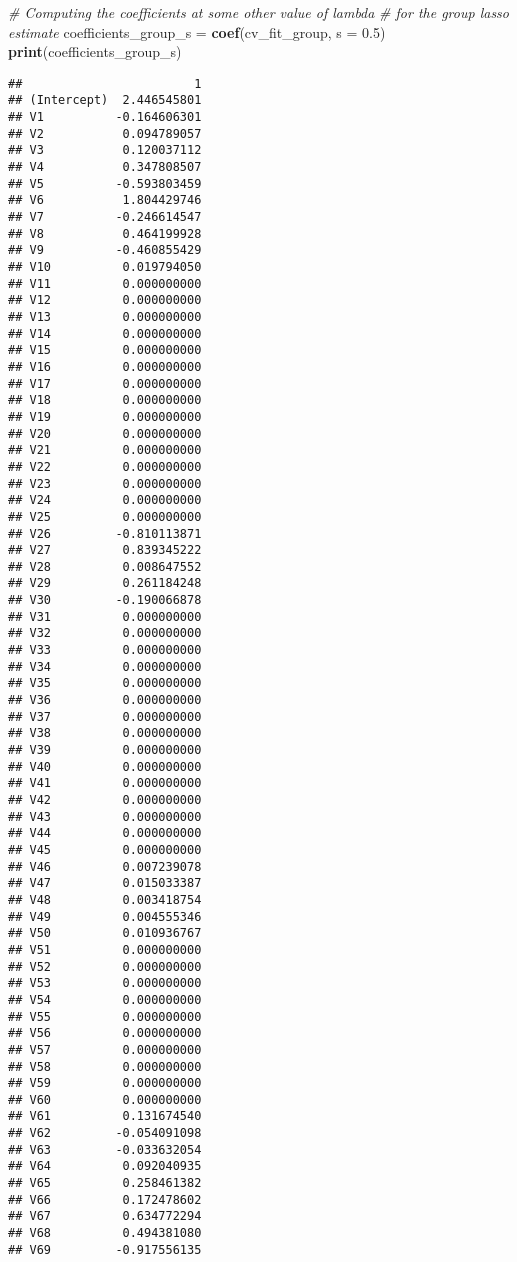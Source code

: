 \documentclass[
]{book}
\newenvironment{Shaded}{\begin{snugshade}}{\end{snugshade}}
\newcommand{\CommentTok}[1]{\textcolor[rgb]{0.56,0.35,0.01}{\textit{#1}}}
\newcommand{\DataTypeTok}[1]{\textcolor[rgb]{0.13,0.29,0.53}{#1}}
\newcommand{\FloatTok}[1]{\textcolor[rgb]{0.00,0.00,0.81}{#1}}
\newcommand{\KeywordTok}[1]{\textcolor[rgb]{0.13,0.29,0.53}{\textbf{#1}}}
\newcommand{\NormalTok}[1]{#1}
\newcommand{\StringTok}[1]{\textcolor[rgb]{0.31,0.60,0.02}{#1}}
\begin{document}
\begin{Shaded}
\begin{Highlighting}[]
\CommentTok{# Computing the coefficients at some other value of lambda}
\CommentTok{# for the group lasso estimate}
\NormalTok{coefficients_group_s =}\StringTok{ }\KeywordTok{coef}\NormalTok{(cv_fit_group, }\DataTypeTok{s =} \FloatTok{0.5}\NormalTok{)}
\KeywordTok{print}\NormalTok{(coefficients_group_s)}
\end{Highlighting}
\end{Shaded}

\begin{verbatim}
##                        1
## (Intercept)  2.446545801
## V1          -0.164606301
## V2           0.094789057
## V3           0.120037112
## V4           0.347808507
## V5          -0.593803459
## V6           1.804429746
## V7          -0.246614547
## V8           0.464199928
## V9          -0.460855429
## V10          0.019794050
## V11          0.000000000
## V12          0.000000000
## V13          0.000000000
## V14          0.000000000
## V15          0.000000000
## V16          0.000000000
## V17          0.000000000
## V18          0.000000000
## V19          0.000000000
## V20          0.000000000
## V21          0.000000000
## V22          0.000000000
## V23          0.000000000
## V24          0.000000000
## V25          0.000000000
## V26         -0.810113871
## V27          0.839345222
## V28          0.008647552
## V29          0.261184248
## V30         -0.190066878
## V31          0.000000000
## V32          0.000000000
## V33          0.000000000
## V34          0.000000000
## V35          0.000000000
## V36          0.000000000
## V37          0.000000000
## V38          0.000000000
## V39          0.000000000
## V40          0.000000000
## V41          0.000000000
## V42          0.000000000
## V43          0.000000000
## V44          0.000000000
## V45          0.000000000
## V46          0.007239078
## V47          0.015033387
## V48          0.003418754
## V49          0.004555346
## V50          0.010936767
## V51          0.000000000
## V52          0.000000000
## V53          0.000000000
## V54          0.000000000
## V55          0.000000000
## V56          0.000000000
## V57          0.000000000
## V58          0.000000000
## V59          0.000000000
## V60          0.000000000
## V61          0.131674540
## V62         -0.054091098
## V63         -0.033632054
## V64          0.092040935
## V65          0.258461382
## V66          0.172478602
## V67          0.634772294
## V68          0.494381080
## V69         -0.917556135

\end{verbatim}
\end{document}
